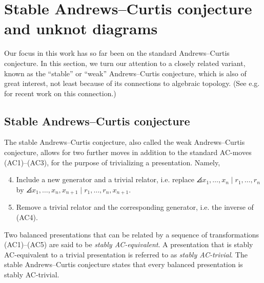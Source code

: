 
\section{Stable Andrews--Curtis conjecture and unknot diagrams}\label{sec:stable}

Our focus in this work has so far been on the standard Andrews--Curtis conjecture. In this section, we turn our attention to a closely related variant, known as the “stable” or “weak” Andrews--Curtis conjecture, which is also of great interest, not least because of its connections to algebraic topology. (See e.g. \cite{Meier2016,Bagherifard2021} for recent work on this connection.)

\subsection{Stable Andrews--Curtis conjecture} \label{subsec:stable}

The stable Andrews--Curtis conjecture, also called the weak Andrews--Curtis conjecture, allows for two further moves in addition to the standard AC-moves (AC1)--(AC3), for the purpose of trivializing a presentation. Namely,
\begin{enumerate}[label=(AC\arabic*)]
	\setcounter{enumi}{3}
	\item Include a new generator and a trivial relator, i.e. replace $\angles{x_1, \dots, x_n \mid r_1, \dots, r_n}$ by $\angles{x_1, \dots, x_n, x_{n+1} \mid r_1, \dots, r_n, x_{n+1}}$.
	\item Remove a trivial relator and the corresponding generator, i.e. the inverse of (AC4).
\end{enumerate}

Two balanced presentations that can be related by a sequence of transformations (AC1)--(AC5) are said to be \textit{stably AC-equivalent}. A presentation that is stably AC-equivalent to a trivial presentation is referred to as \emph{stably AC-trivial}. The stable Andrews--Curtis conjecture states that every balanced presentation is stably AC-trivial. 

